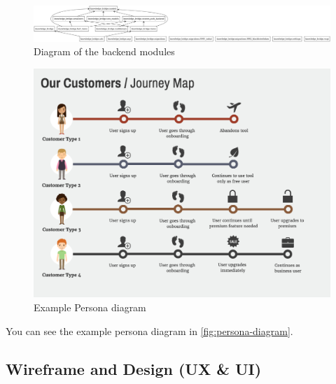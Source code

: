 \documentclass[12pt,a4paper]{article}
\begin{document}
\begin{spacing}{1.5}
    \begin{figure}[H]
        \centering
        \includegraphics[width=1\linewidth]{assets/KnowledgeBridgePackages.png}
        \caption{Diagram of the backend modules}
        \label{fig:backend-modules}
    \end{figure}
    \FloatBarrier

    \begin{figure}[H]
        \centering
        \includegraphics[width=1\linewidth]{assets/persona-diagram-example.png}
        \caption{Example Persona diagram}
        \label{fig:persona-diagram}
    \end{figure}

    You can see the example persona diagram in \autoref{fig:persona-diagram}.
    \FloatBarrier

    \newpage
    \subsection{Wireframe and Design (UX \& UI)}\label{subseq:wireframe-and-design}

\end{spacing}
\end{document}
